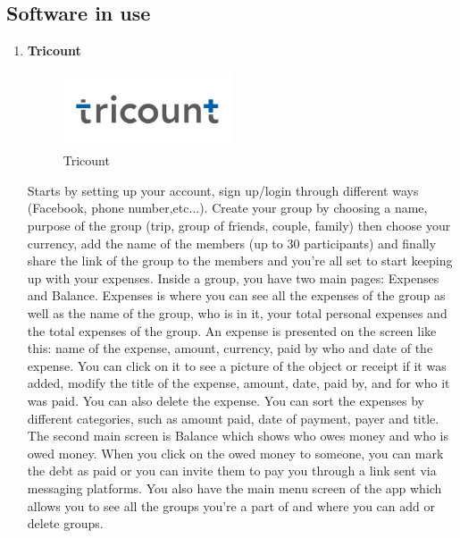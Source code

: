 \documentclass[conference]{IEEEtran}
\begin{document}
\subsection{Software in use}
\begin{enumerate}
    \item \textbf{Tricount} \\
        \begin{figure}[htbp]
            \centerline{\includegraphics[width=50mm,scale=0.5]{img/logo-tricount.png}}
            \caption{Tricount}
            \label{fig:my_label}
        \end{figure}
        \newline
        Starts by setting up your account, sign up/login through different ways (Facebook, phone number,etc...). Create your group by choosing a name, purpose of the group (trip, group of friends, couple, family) then choose your currency, add the name of the members (up to 30 participants) and finally share the link of the group to the members and you're all set to start keeping up with your expenses. 
        \newline
        Inside a group, you have two main pages: Expenses and Balance. Expenses is where you can see all the expenses of the group as well as the name of the group, who is in it, your total personal expenses and the total expenses of the group. An expense is presented on the screen like this: name of the expense, amount, currency, paid by who and date of the expense. You can click on it to see a picture of the object or receipt if it was added, modify the title of the expense, amount, date, paid by, and for who it was paid. You can also delete the expense. You can sort the expenses by different categories, such as amount paid, date of payment, payer and title.
        \newline
        The second main screen is Balance which shows who owes money and who is owed money. When you click on the owed money to someone, you can mark the debt as paid or you can invite them to pay you through a link sent via messaging platforms. 
        \newline
        You also have the main menu screen of the app which allows you to see all the groups you're a part of and where you can add or delete groups.

\end{enumerate}
\end{document}
